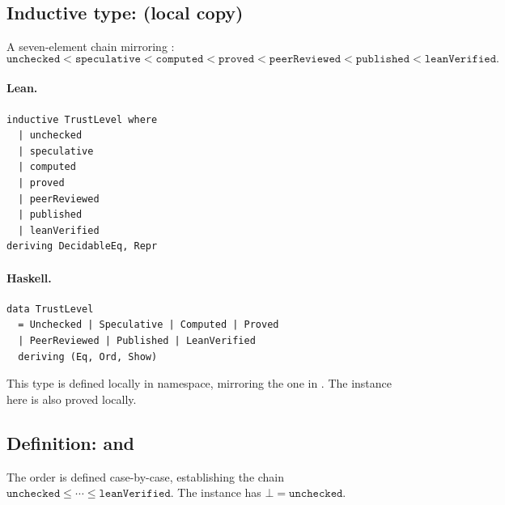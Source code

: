 \documentclass[11pt,a4paper]{article}
\begin{document}
\subsection{Inductive type:  (local copy)}

\begin{defn}
A seven-element chain mirroring :
\[
  \mathtt{unchecked} < \mathtt{speculative} < \mathtt{computed} <
  \mathtt{proved} < \mathtt{peerReviewed} < \mathtt{published} <
  \mathtt{leanVerified}.
\]
\end{defn}

\paragraph{Lean.}
\begin{lstlisting}[style=lean]
inductive TrustLevel where
  | unchecked
  | speculative
  | computed
  | proved
  | peerReviewed
  | published
  | leanVerified
deriving DecidableEq, Repr
\end{lstlisting}

\paragraph{Haskell.}
\begin{lstlisting}[style=haskell]
data TrustLevel
  = Unchecked | Speculative | Computed | Proved
  | PeerReviewed | Published | LeanVerified
  deriving (Eq, Ord, Show)
\end{lstlisting}

\begin{fidelitynote}
This type is defined locally in  namespace, mirroring the
one in .  The  instance here
is also proved locally.
\end{fidelitynote}


\subsection{Definition:  and }

\begin{defn}
The order is defined case-by-case, establishing the chain
$\mathtt{unchecked} \le \cdots \le \mathtt{leanVerified}$.  The
 instance has $\bot = \mathtt{unchecked}$.
\end{defn}
\end{document}
